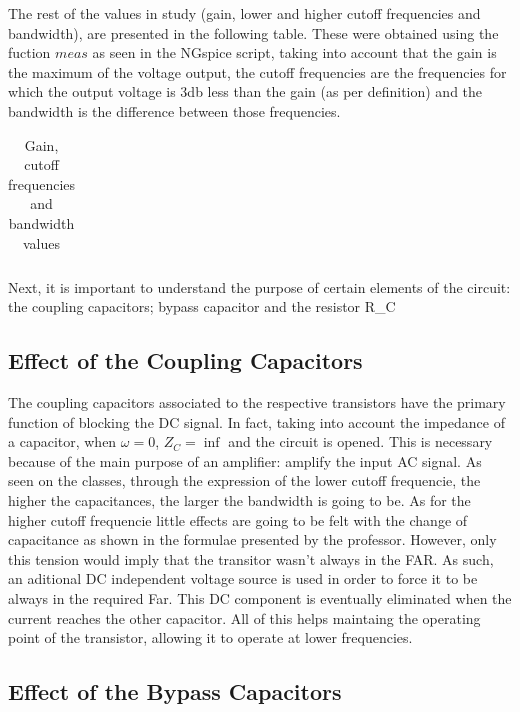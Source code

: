 \par The rest of the values in study (gain, lower and higher cutoff frequencies and bandwidth),  are presented in the following table. These were obtained using the fuction $meas$ as seen in the NGspice script, taking into account that the gain is the maximum of the voltage output, the cutoff frequencies are the frequencies for which the output voltage is 3db less than the gain (as per definition) and the bandwidth is the difference between those frequencies.

\begin{table}[ht]
  \centering
  \begin{tabular}{|l|r|}
    \hline    
   
    \end{tabular}
  \caption{Gain, cutoff frequencies and bandwidth values}
    \label{tab:results}
\end{table}

\par Next, it is important to understand the purpose of certain elements of the circuit: the coupling capacitors; bypass capacitor and the resistor R_C 

\subsection{Effect of the Coupling Capacitors}

\par The coupling capacitors associated to the respective transistors have the primary function of blocking the DC signal. In fact, taking into account the impedance of a capacitor, when $\omega=0$, $Z_C=\inf$ and the circuit is opened. This is necessary because of the main purpose of an amplifier: amplify the input AC signal. As seen on the classes, through the expression of the lower cutoff frequencie, the higher the capacitances, the larger the bandwidth is going to be. As for the higher cutoff frequencie little effects are going to be felt with the change of capacitance as shown in the formulae presented by the professor. However, only this tension would imply that the transitor wasn't always in the FAR. As such, an aditional DC independent voltage source is used in order to force it to be always in the required Far. This DC component is eventually eliminated when the current reaches the other capacitor. All of this helps maintaing the operating point of the transistor, allowing it to operate at lower frequencies.

\subsection{Effect of the Bypass Capacitors}

